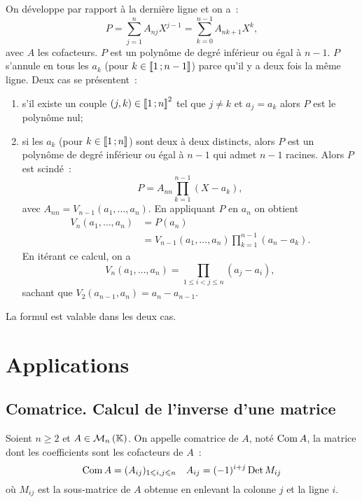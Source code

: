 On développe par rapport à la dernière ligne et on a~:
\begin{equation}
  P = \sum_{j=1}^n A_{nj} X^{j-1}=\sum_{k=0}^{n-1} A_{n k+1} X^{k},
\end{equation}
avec \(A\) les cofacteurs. \(P\) est un polynôme de degré inférieur ou égal à \(n-1\). \(P\) s'annule en tous les \(a_k\) (pour \(k \in \mathopen{\llbracket}1\mathclose{}\mathpunct{};n-1\mathclose{\rrbracket}\)) parce qu'il y a deux fois la même ligne. Deux cas se présentent~:
\begin{enumerate}
\item s'il existe un couple \((j,k) \in \mathopen{\llbracket}1\mathclose{}\mathpunct{};n\mathclose{\rrbracket}^2\) tel que \(j \neq k\) et \(a_j=a_k\) alors \(P\) est le polynôme nul;
\item si les \(a_k\) (pour \(k \in \mathopen{\llbracket}1\mathclose{}\mathpunct{};n\mathclose{\rrbracket}\)) sont deux à deux distincts, alors \(P\) est un polynôme de degré inférieur ou égal à \(n-1\) qui admet \(n-1\) racines. Alors \(P\) est scindé~:
  \begin{equation}
    P = A_{nn} \prod_{k=1}^{n-1}(X-a_k),
  \end{equation}
  avec \(A_{nn} = V_{n-1}(a_1, \ldots, a_n)\). En appliquant \(P\) en \(a_n\) on obtient
  \begin{align}
    V_{n}(a_1, \ldots, a_n) &= P(a_n) \\
    &=V_{n-1}(a_1, \ldots, a_n) \prod_{k=1}^{n-1}(a_n-a_k).
  \end{align}
  En itérant ce calcul, on a
  \begin{equation}
    V_{n}(a_1, \ldots, a_n) = \prod_{1 \le i < j \leqslant n} (a_j-a_i),
  \end{equation}
  sachant que \(V_2(a_{n-1},a_n)=a_n-a_{n-1}\).
\end{enumerate}

La formul est valable dans les deux cas.


\section{Applications}

\subsection{Comatrice. Calcul de l'inverse d'une matrice}

\begin{defdef}
  Soient \(n \geqslant 2\) et \(A \in \mathcal{M}_{n}\left(\mathbb{K}\right)\). On appelle comatrice de \(A\), noté \(\operatorname{Com} A\), la matrice dont les coefficients sont les cofacteurs de \(A\)~:
  \begin{equation}
    \operatorname{Com} A = (A_{ij})_{1 \leqslant i,j \leqslant n} \quad A_{ij}=(-1)^{i+j} \operatorname{Det} M_{ij}
  \end{equation}
  où \(M_{ij}\) est la sous-matrice de \(A\) obtenue en enlevant la colonne \(j\) et la ligne \(i\).
\end{defdef}

